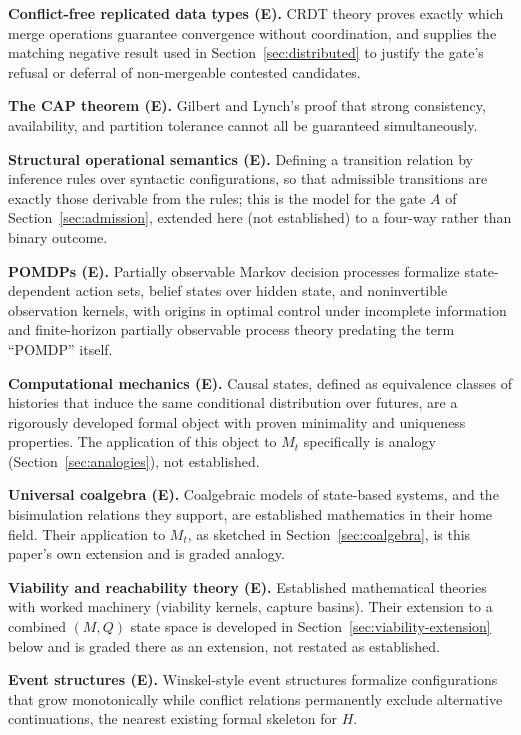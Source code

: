 \documentclass[11pt]{article}
\begin{document}
\textbf{Conflict-free replicated data types (E).} CRDT theory proves exactly which merge operations guarantee convergence without coordination, and supplies the matching negative result used in Section~\ref{sec:distributed} to justify the gate's refusal or deferral of non-mergeable contested candidates.

\textbf{The CAP theorem (E).} Gilbert and Lynch's proof that strong consistency, availability, and partition tolerance cannot all be guaranteed simultaneously.

\textbf{Structural operational semantics (E).} Defining a transition relation by inference rules over syntactic configurations, so that admissible transitions are exactly those derivable from the rules; this is the model for the gate $A$ of Section~\ref{sec:admission}, extended here (not established) to a four-way rather than binary outcome.

\textbf{POMDPs (E).} Partially observable Markov decision processes formalize state-dependent action sets, belief states over hidden state, and noninvertible observation kernels, with origins in optimal control under incomplete information and finite-horizon partially observable process theory predating the term ``POMDP'' itself.

\textbf{Computational mechanics (E).} Causal states, defined as equivalence classes of histories that induce the same conditional distribution over futures, are a rigorously developed formal object with proven minimality and uniqueness properties. The application of this object to $M_t$ specifically is analogy (Section~\ref{sec:analogies}), not established.

\textbf{Universal coalgebra (E).} Coalgebraic models of state-based systems, and the bisimulation relations they support, are established mathematics in their home field. Their application to $M_t$, as sketched in Section~\ref{sec:coalgebra}, is this paper's own extension and is graded analogy.

\textbf{Viability and reachability theory (E).} Established mathematical theories with worked machinery (viability kernels, capture basins). Their extension to a combined $(M,Q)$ state space is developed in Section~\ref{sec:viability-extension} below and is graded there as an extension, not restated as established.

\textbf{Event structures (E).} Winskel-style event structures formalize configurations that grow monotonically while conflict relations permanently exclude alternative continuations, the nearest existing formal skeleton for $H$.
\end{document}
